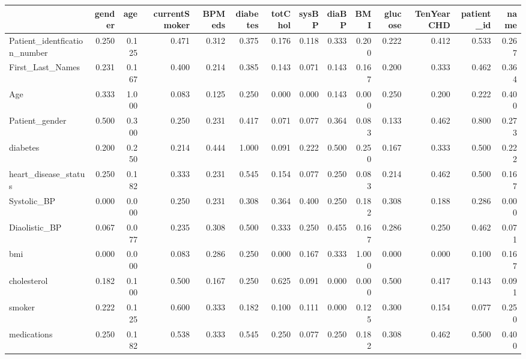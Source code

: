 \begin{tabular}{lrrrrrrrrrrrrr}
\toprule
 & gender & age & currentSmoker & BPMeds & diabetes & totChol & sysBP & diaBP & BMI & glucose & TenYearCHD & patient_id & name \\
\midrule
Patient_identfication_number & 0.250 & 0.125 & 0.471 & 0.312 & 0.375 & 0.176 & 0.118 & 0.333 & 0.200 & 0.222 & 0.412 & 0.533 & 0.267 \\
First_Last_Names & 0.231 & 0.167 & 0.400 & 0.214 & 0.385 & 0.143 & 0.071 & 0.143 & 0.167 & 0.200 & 0.333 & 0.462 & 0.364 \\
Age & 0.333 & 1.000 & 0.083 & 0.125 & 0.250 & 0.000 & 0.000 & 0.143 & 0.000 & 0.250 & 0.200 & 0.222 & 0.400 \\
Patient_gender & 0.500 & 0.300 & 0.250 & 0.231 & 0.417 & 0.071 & 0.077 & 0.364 & 0.083 & 0.133 & 0.462 & 0.800 & 0.273 \\
diabetes & 0.200 & 0.250 & 0.214 & 0.444 & 1.000 & 0.091 & 0.222 & 0.500 & 0.250 & 0.167 & 0.333 & 0.500 & 0.222 \\
heart_disease_status & 0.250 & 0.182 & 0.333 & 0.231 & 0.545 & 0.154 & 0.077 & 0.250 & 0.083 & 0.214 & 0.462 & 0.500 & 0.167 \\
Systolic_BP & 0.000 & 0.000 & 0.250 & 0.231 & 0.308 & 0.364 & 0.400 & 0.250 & 0.182 & 0.308 & 0.188 & 0.286 & 0.000 \\
Diaolistic_BP & 0.067 & 0.077 & 0.235 & 0.308 & 0.500 & 0.333 & 0.250 & 0.455 & 0.167 & 0.286 & 0.250 & 0.462 & 0.071 \\
bmi & 0.000 & 0.000 & 0.083 & 0.286 & 0.250 & 0.000 & 0.167 & 0.333 & 1.000 & 0.000 & 0.000 & 0.100 & 0.167 \\
cholesterol & 0.182 & 0.100 & 0.500 & 0.167 & 0.250 & 0.625 & 0.091 & 0.000 & 0.000 & 0.500 & 0.417 & 0.143 & 0.091 \\
smoker & 0.222 & 0.125 & 0.600 & 0.333 & 0.182 & 0.100 & 0.111 & 0.000 & 0.125 & 0.300 & 0.154 & 0.077 & 0.250 \\
medications & 0.250 & 0.182 & 0.538 & 0.333 & 0.545 & 0.250 & 0.077 & 0.250 & 0.182 & 0.308 & 0.462 & 0.500 & 0.400 \\
\bottomrule
\end{tabular}
